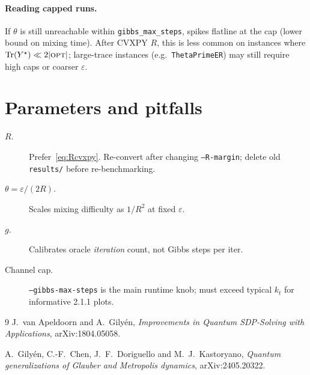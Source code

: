 \documentclass[11pt]{article}
\newcommand{\Tr}{\operatorname{Tr}}
\newcommand{\eps}{\varepsilon}
\begin{document}
\paragraph{Reading capped runs.}
If $\theta$ is still unreachable within \texttt{gibbs\_max\_steps}, spikes
flatline at the cap (lower bound on mixing time). After CVXPY $R$, this is less
common on instances where $\Tr(Y^\star)\ll 2|\textsc{opt}|$; large-trace
instances (e.g.\ \texttt{ThetaPrimeER}) may still require high caps or coarser
$\eps$.

\section{Parameters and pitfalls}
\label{sec:params}

\begin{description}
  \item[$R$.] Prefer~\eqref{eq:Rcvxpy}. Re-convert after changing
  \texttt{--R-margin}; delete old \texttt{results/} before re-benchmarking.
  \item[$\theta=\eps/(2R)$.] Scales mixing difficulty as $1/R^2$ at fixed $\eps$.
  \item[$g$.] Calibrates oracle \emph{iteration} count, not Gibbs steps per iter.
  \item[Channel cap.] \texttt{--gibbs-max-steps} is the main runtime knob; must
  exceed typical $k_t$ for informative 2.1.1 plots.
\end{description}

\begin{thebibliography}{9}
J.~van Apeldoorn and A.~Gily\'en,
\emph{Improvements in Quantum SDP-Solving with Applications},
arXiv:1804.05058.

A.~Gily\'en, C.-F.~Chen, J.~F.~Doriguello and M.~J.~Kastoryano,
\emph{Quantum generalizations of Glauber and Metropolis dynamics},
arXiv:2405.20322.
\end{thebibliography}
\end{document}
